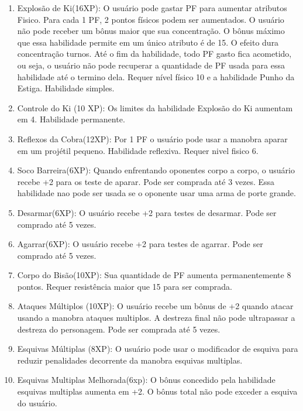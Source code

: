 \begin{enumerate}
		\item Explosão de Ki(16XP): O usuário pode gastar PF para aumentar atributos Fisico. Para cada 1 PF, 2 pontos físicos podem ser aumentados. O usuário não pode receber um bônus maior que sua concentração. O bônus máximo que essa habilidade permite em um único atributo é de 15. O efeito dura concentração turnos. Até o fim da habilidade, todo PF gasto fica acometido, ou seja, o usuário não pode recuperar a quantidade de PF usada para essa habilidade até o termino dela. Requer nível físico 10 e a habilidade Punho da Estiga. Habilidade simples.
 
		\item Controle do Ki (10 XP): Os limites da habilidade Explosão do Ki aumentam em 4. Habilidade permanente.

		\item Reflexos da Cobra(12XP): Por 1 PF o usuário pode usar a manobra aparar em um projétil pequeno. Habilidade reflexiva. Requer nivel fisico 6.

  	\item Soco Barreira(6XP): Quando enfrentando oponentes corpo a corpo, o usuário recebe +2 para os teste de aparar. Pode ser comprada até 3 vezes. Essa habilidade nao pode ser usada se o oponente usar uma arma de porte grande.
  
  	\item Desarmar(6XP): O usuário recebe +2 para testes de desarmar. Pode ser comprado até 5 vezes.
  
  	\item Agarrar(6XP): O usuário recebe +2 para testes de agarrar. Pode ser comprado até 5 vezes.
  
	\item Corpo do Bisão(10XP): Sua quantidade de PF aumenta permanentemente 8 pontos. Requer resistência maior que 15 para ser comprada.

	\item Ataques Múltiplos (10XP): O usuário recebe um bônus de +2 quando atacar usando a manobra ataques multiplos. A destreza final não pode ultrapassar a destreza do personagem. Pode ser comprada até 5 vezes. 

	\item Esquivas Múltiplas (8XP): O usuário pode usar o modificador de esquiva para reduzir penalidades decorrente da manobra esquivas multiplas. 

	\item Esquivas Multiplas Melhorada(6xp): O bônus concedido pela habilidade esquivas multiplas aumenta em +2. O bônus total não pode exceder a esquiva do usuário.
  

\end{enumerate}
